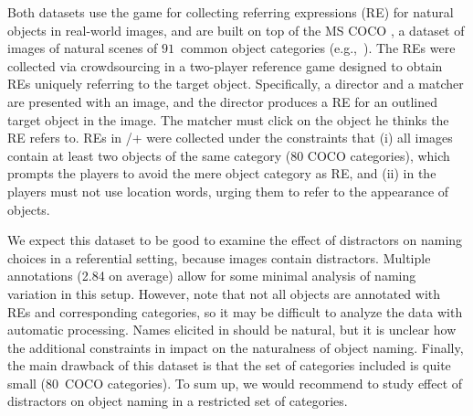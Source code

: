 Both datasets use the \cite{Kazemzadeh2014} game for collecting referring expressions (RE) for natural objects in real-world images, and are built on top of the MS COCO \cite{mscoco}, 
a dataset of images of natural scenes of $91$~common object categories (e.g.,~). 
The REs were collected via crowdsourcing in a two-player reference game designed to obtain REs uniquely referring to the target object. 
Specifically, a director and a matcher are presented with an image, and the director produces a RE for an outlined target object in the image. 
The matcher must click on the object he thinks the RE refers to. %
REs in /+ were collected under the constraints that (i) all images contain at least two objects of the same category (80 COCO categories), which prompts the players to avoid the mere object category as RE, and (ii) in  the players must not use location words, urging them to refer to the appearance of objects.  

We expect this dataset to be good to examine the effect of distractors on naming choices in a referential setting, because images contain distractors.
Multiple annotations (2.84 on average) allow for some minimal analysis of naming variation in this setup. 
However, note that not all objects are annotated with REs and corresponding categories, so it may be difficult to analyze the data with automatic processing.
Names elicited in  should be natural, but it is unclear how the additional constraints in  impact on the naturalness of object naming.
Finally, the main drawback of this dataset is that the set of categories included is quite small ($80$~COCO categories).
To sum up, we would recommend  to study effect of distractors on object naming in a restricted set of categories.

